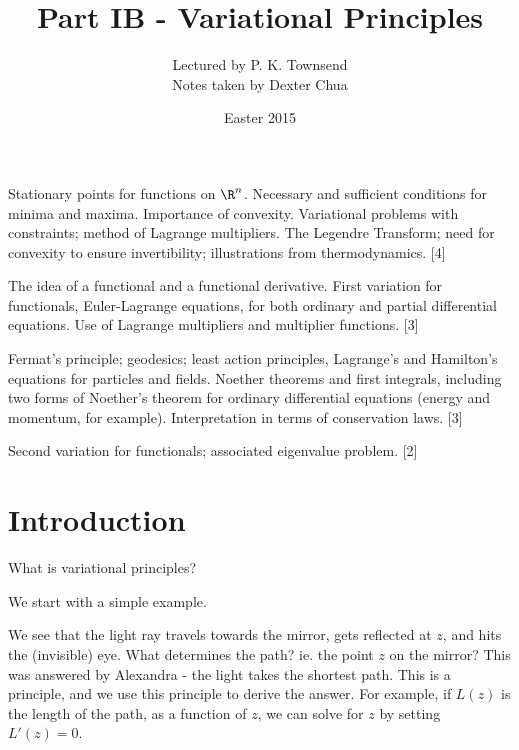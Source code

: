 \documentclass[a4paper]{article}
\title{Part IB - Variational Principles}
\author{Lectured by P. K. Townsend\\\small Notes taken by Dexter Chua}
\date{Easter 2015}
\begin{document}
\maketitle
{\small
\noindent Stationary points for functions on $\R^n$. Necessary and sufficient conditions for minima and maxima. Importance of convexity. Variational problems with constraints; method of Lagrange multipliers. The Legendre Transform; need for convexity to ensure invertibility; illustrations from thermodynamics.\hspace*{\fill} [4]

\vspace{5pt}
\noindent The idea of a functional and a functional derivative. First variation for functionals, Euler-Lagrange equations, for both ordinary and partial differential equations. Use of Lagrange multipliers and multiplier functions.\hspace*{\fill} [3]

\vspace{5pt}
\noindent Fermat's principle; geodesics; least action principles, Lagrange's and Hamilton's equations for particles and fields. Noether theorems and first integrals, including two forms of Noether's theorem for ordinary differential equations (energy and momentum, for example). Interpretation in terms of conservation laws.\hspace*{\fill} [3]

\vspace{5pt}
\noindent Second variation for functionals; associated eigenvalue problem.\hspace*{\fill} [2]}

\tableofcontents
\setcounter{section}{-1}
\section{Introduction}
What is variational principles?

We start with a simple example.
\begin{center}
\end{center}
We see that the light ray travels towards the mirror, gets reflected at $z$, and hits the (invisible) eye. What determines the path? ie. the point $z$ on the mirror? This was answered by Alexandra - the light takes the shortest path. This is a principle, and we use this principle to derive the answer. For example, if $L(z)$ is the length of the path, as a function of $z$, we can solve for $z$ by setting $L'(z) = 0$.
\end{document}
